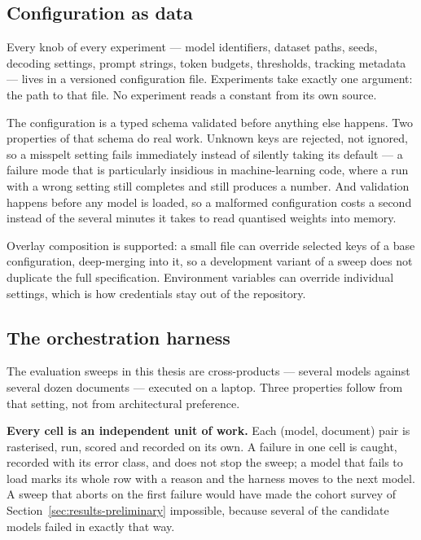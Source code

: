 \subsection{Configuration as data}

Every knob of every experiment --- model identifiers, dataset paths, seeds, decoding
settings, prompt strings, token budgets, thresholds, tracking metadata --- lives in a
versioned configuration file. Experiments take exactly one argument: the path to that file.
No experiment reads a constant from its own source.

The configuration is a typed schema validated before anything else happens. Two properties of
that schema do real work. Unknown keys are rejected, not ignored, so a misspelt setting
fails immediately instead of silently taking its default --- a failure mode that is
particularly insidious in machine-learning code, where a run with a wrong setting still
completes and still produces a number. And validation happens before any model is loaded, so a
malformed configuration costs a second instead of the several minutes it takes to read
quantised weights into memory.

Overlay composition is supported: a small file can override selected keys of a base
configuration, deep-merging into it, so a development variant of a sweep does not duplicate the
full specification. Environment variables can override individual settings, which is how
credentials stay out of the repository.

\subsection{The orchestration harness}

The evaluation sweeps in this thesis are cross-products --- several models against several
dozen documents --- executed on a laptop. Three properties follow from that setting, not
from architectural preference.

\textbf{Every cell is an independent unit of work.} Each (model, document) pair is rasterised,
run, scored and recorded on its own. A failure in one cell is caught, recorded with its error
class, and does not stop the sweep; a model that fails to load marks its whole row with a
reason and the harness moves to the next model. A sweep that aborts on the first failure would
have made the cohort survey of Section~\ref{sec:results-preliminary} impossible, because several of
the candidate models failed in exactly that way.

